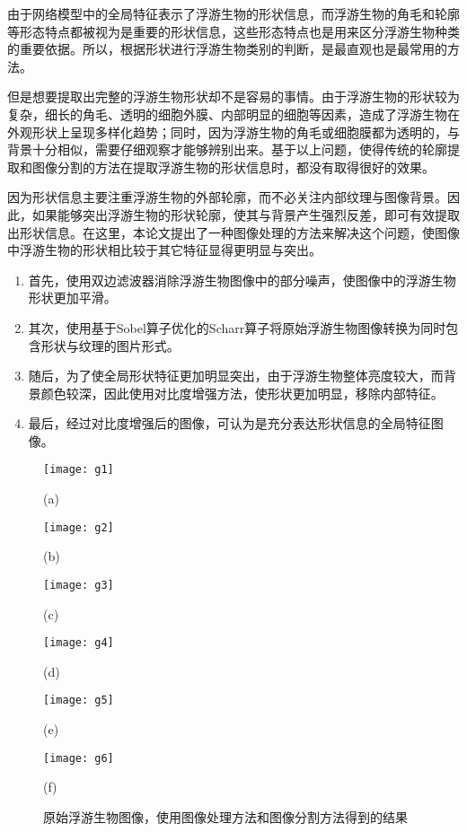 由于网络模型中的全局特征表示了浮游生物的形状信息，而浮游生物的角毛和轮廓等形态特点都被视为是重要的形状信息\cite{zheng2014automatic}，这些形态特点也是用来区分浮游生物种类的重要依据。所以，根据形状进行浮游生物类别的判断，是最直观也是最常用的方法。

但是想要提取出完整的浮游生物形状却不是容易的事情。由于浮游生物的形状较为复杂，细长的角毛、透明的细胞外膜、内部明显的细胞等因素，造成了浮游生物在外观形状上呈现多样化趋势；同时，因为浮游生物的角毛或细胞膜都为透明的，与背景十分相似，需要仔细观察才能够辨别出来。基于以上问题，使得传统的轮廓提取和图像分割的方法在提取浮游生物的形状信息时，都没有取得很好的效果。

因为形状信息主要注重浮游生物的外部轮廓，而不必关注内部纹理与图像背景。因此，如果能够突出浮游生物的形状轮廓，使其与背景产生强烈反差，即可有效提取出形状信息。在这里，本论文提出了一种图像处理的方法来解决这个问题，使图像中浮游生物的形状相比较于其它特征显得更明显与突出。
\begin{enumerate}
\item 首先，使用双边滤波器\cite{tomasi1998bilateral}消除浮游生物图像中的部分噪声，使图像中的浮游生物形状更加平滑。
\item 其次，使用基于Sobel算子优化的Scharr算子\cite{scharr2000optimal}将原始浮游生物图像转换为同时包含形状与纹理的图片形式。
\item 随后，为了使全局形状特征更加明显突出，由于浮游生物整体亮度较大，而背景颜色较深，因此使用对比度增强方法，使形状更加明显，移除内部特征。
\item 最后，经过对比度增强后的图像，可认为是充分表达形状信息的全局特征图像。
\end{enumerate}

\begin{figure}[H]
\centering
\begin{minipage}[]{0.3\linewidth} 
      \centering 
      \texttt{[image: g1]}
        \centerline{(a) }\medskip
\end{minipage}
  \begin{minipage}[]{0.3\linewidth}
    \centering
    \texttt{[image: g2]}
      \centerline{(b) }\medskip
  \end{minipage}
  \begin{minipage}[]{0.3\linewidth}
    \centering
    \texttt{[image: g3]}
      \centerline{(c) }\medskip
  \end{minipage}
\begin{minipage}[]{0.3\linewidth} 
      \centering 
      \texttt{[image: g4]}
        \centerline{(d) }\medskip
\end{minipage}
  \begin{minipage}[]{0.3\linewidth}
    \centering
    \texttt{[image: g5]}
      \centerline{(e) }\medskip
  \end{minipage}
  \begin{minipage}[]{0.3\linewidth}
    \centering
    \texttt{[image: g6]}
      \centerline{(f) }\medskip
  \end{minipage}
  \caption{原始浮游生物图像，使用图像处理方法和图像分割方法得到的结果}
\label{fig:shape}
\end{figure}

